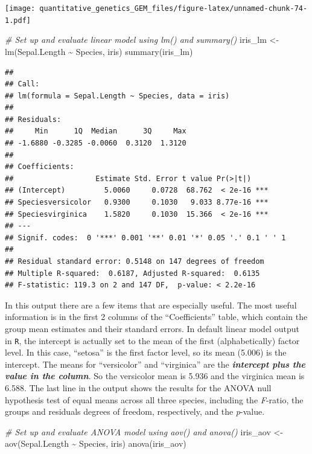 \documentclass[
]{book}
\newenvironment{Shaded}{\begin{snugshade}}{\end{snugshade}}
\newcommand{\CommentTok}[1]{\textcolor[rgb]{0.56,0.35,0.01}{\textit{#1}}}
\newcommand{\FunctionTok}[1]{\textcolor[rgb]{0.00,0.00,0.00}{#1}}
\newcommand{\NormalTok}[1]{#1}
\newcommand{\OtherTok}[1]{\textcolor[rgb]{0.56,0.35,0.01}{#1}}
\newcommand{\SpecialCharTok}[1]{\textcolor[rgb]{0.00,0.00,0.00}{#1}}
\begin{document}
\texttt{[image: quantitative\_genetics\_GEM\_files/figure-latex/unnamed-chunk-74-1.pdf]}

\begin{Shaded}
\begin{Highlighting}[]
\CommentTok{\# Set up and evaluate linear model using lm() and summary()}
\NormalTok{iris\_lm }\OtherTok{\textless{}{-}} \FunctionTok{lm}\NormalTok{(Sepal.Length }\SpecialCharTok{\textasciitilde{}}\NormalTok{ Species, iris)}
\FunctionTok{summary}\NormalTok{(iris\_lm)}
\end{Highlighting}
\end{Shaded}

\begin{verbatim}
## 
## Call:
## lm(formula = Sepal.Length ~ Species, data = iris)
## 
## Residuals:
##     Min      1Q  Median      3Q     Max 
## -1.6880 -0.3285 -0.0060  0.3120  1.3120 
## 
## Coefficients:
##                   Estimate Std. Error t value Pr(>|t|)    
## (Intercept)         5.0060     0.0728  68.762  < 2e-16 ***
## Speciesversicolor   0.9300     0.1030   9.033 8.77e-16 ***
## Speciesvirginica    1.5820     0.1030  15.366  < 2e-16 ***
## ---
## Signif. codes:  0 '***' 0.001 '**' 0.01 '*' 0.05 '.' 0.1 ' ' 1
## 
## Residual standard error: 0.5148 on 147 degrees of freedom
## Multiple R-squared:  0.6187, Adjusted R-squared:  0.6135 
## F-statistic: 119.3 on 2 and 147 DF,  p-value: < 2.2e-16
\end{verbatim}

In this output there are a few items that are especially useful. The most useful information is in the first 2 columns of the ``Coefficients'' table, which contain the group mean estimates and their standard errors. In default linear model output in \texttt{R}, the intercept is actually set to the mean of the first (alphabetically) factor level. In this case, ``setosa'' is the first factor level, so its mean (5.006) is the intercept. The means for ``versicolor'' and ``virginica'' are the \textbf{\emph{intercept plus the value in the column}}. So the versicolor mean is 5.936 and the virginica mean is 6.588. The last line in the output shows the results for the ANOVA null hypothesis test of equal means across all three species, including the \emph{F}-ratio, the groups and residuals degrees of freedom, respectively, and the \emph{p}-value.

\begin{Shaded}
\begin{Highlighting}[]
\CommentTok{\# Set up and evaluate ANOVA model using aov() and anova()}
\NormalTok{iris\_aov }\OtherTok{\textless{}{-}} \FunctionTok{aov}\NormalTok{(Sepal.Length }\SpecialCharTok{\textasciitilde{}}\NormalTok{ Species, iris)}
\FunctionTok{anova}\NormalTok{(iris\_aov)}
\end{Highlighting}
\end{Shaded}
\end{document}
